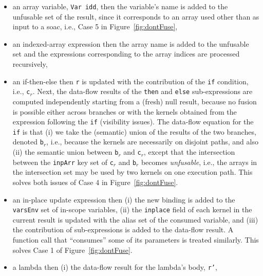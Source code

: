 \documentclass{sigplanconf}  %
\newcommand{\emp}[1]{\textcolor{DikuRed}{ #1}}
\begin{document}
\begin{itemize}
    \item an array variable, {\tt Var idd}, then the variable's 
            name is added to the unfusable set of the result,
            since it corresponds to an array used other than as 
            input to a {\sc soac}, i.e., \emp{Case 5} in Figure~\ref{fig:dontFuse},
    \item  an indexed-array expression then the array name is added to the 
            unfusable set and the expressions corresponding to the array indices
                are processed recursively,
    \item  an if-then-else then {\tt r} is updated with the contribution
            of the {\tt if} condition, i.e., {\tt c$_r$}. Next, the data-flow results of
            the {\tt then} and {\tt else} sub-expressions are computed independently 
            starting from a (fresh) null result, because no fusion is 
            possible either across branches or with the kernels obtained from the
            expression following the {\tt if} (visibility issues). 
            The data-flow equation for the {\tt if} is that (i) we take the (semantic) 
                union of the results of the two branches, denoted {\tt b$_r$}, i.e., because 
                the kernels are necessarily on disjoint paths, and also (ii)
                the semantic union between {\tt b$_r$} and {\tt c$_r$}, except that 
                the intersection between the {\tt inpArr} key set of {\tt c$_r$} and 
                {\tt b$_r$} becomes {\em unfusable}, i.e., the arrays in the intersection set
                may be used by two kernels on one execution path. 
            This solves both issues of \emp{Case 4} in Figure~\ref{fig:dontFuse}.
    \item an in-place update expression then (i) the new binding is added to the
            {\tt varsEnv} set of in-scope variables, (ii) the {\tt inplace}
            field of each kernel in the current result is updated with the
            alias set of the consumed variable, and (iii) the contribution of
            sub-expressions is added to the data-flow result. A function call
                that ``consumes'' some of its parameters is treated similarly.
                This solves \emp{Case 1} of Figure~\ref{fig:dontFuse}.
    \item a lambda then (i) the data-flow result for the lambda's body, {\tt r'},

\end{itemize}
\end{document}
